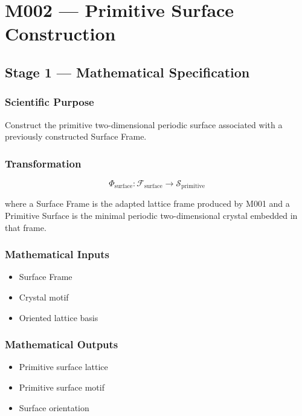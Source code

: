 
\chapter{M002 --- Primitive Surface Construction}
\label{chap:m002}

\section{Stage 1 --- Mathematical Specification}

\subsection{Scientific Purpose}

Construct the primitive two-dimensional periodic surface associated with
a previously constructed Surface Frame.

\subsection{Transformation}

\[
\Phi_{\mathrm{surface}} :
\mathcal{F}_{\mathrm{surface}}
\rightarrow
\mathcal{S}_{\mathrm{primitive}}
\]

where a Surface Frame is the adapted lattice frame produced by M001 and
a Primitive Surface is the minimal periodic two-dimensional crystal
embedded in that frame.

\subsection{Mathematical Inputs}

\begin{itemize}
\item Surface Frame
\item Crystal motif
\item Oriented lattice basis
\end{itemize}

\subsection{Mathematical Outputs}

\begin{itemize}
\item Primitive surface lattice
\item Primitive surface motif
\item Surface orientation
\end{itemize}

